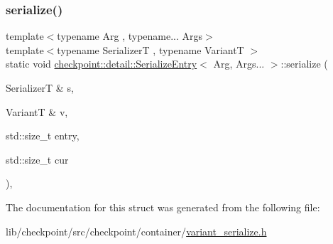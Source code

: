 \subsubsection{\texorpdfstring{serialize()}{serialize()}}
{\footnotesize\ttfamily template$<$typename Arg , typename... Args$>$ \\
template$<$typename SerializerT , typename VariantT $>$ \\
static void \hyperlink{structcheckpoint_1_1detail_1_1_serialize_entry}{checkpoint\+::detail\+::\+Serialize\+Entry}$<$ Arg, Args... $>$\+::serialize (\begin{DoxyParamCaption}\item[{SerializerT \&}]{s,  }\item[{VariantT \&}]{v,  }\item[{std\+::size\+\_\+t}]{entry,  }\item[{std\+::size\+\_\+t}]{cur }\end{DoxyParamCaption})\hspace{0.3cm}{\ttfamily [inline]}, {\ttfamily [static]}}



The documentation for this struct was generated from the following file\+:\begin{DoxyCompactItemize}
\item 
lib/checkpoint/src/checkpoint/container/\hyperlink{variant__serialize_8h}{variant\+\_\+serialize.\+h}\end{DoxyCompactItemize}
